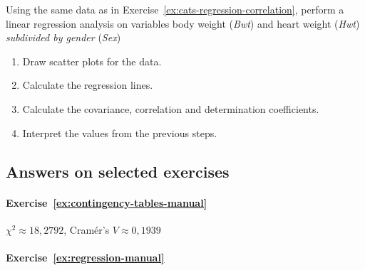 \begin{exercise}
  \label{ex:cats-sex}
  Using the same data as in Exercise~\ref{ex:cats-regression-correlation}, perform a linear regression analysis on variables body weight (\emph{Bwt}) and heart weight (\emph{Hwt}) \emph{subdivided by gender} (\emph{Sex})
  
  \begin{enumerate}
  \item Draw scatter plots for the data.
  \item Calculate the regression lines.
  \item Calculate the covariance, correlation and determination coefficients.
  \item Interpret the values from the previous steps.
  \end{enumerate}
\end{exercise}

%  

\subsection{Answers on selected exercises}
\label{ssec:analyse-2-variabelen-oplossingen}

\paragraph{Exercise~\ref{ex:contingency-tables-manual}}

$\chi^2 \approx 18,2792$, Cramér's $V \approx 0,1939$

\paragraph{Exercise~\ref{ex:regression-manual}}

